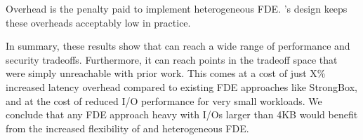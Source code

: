 Overhead is the penalty paid to implement heterogeneous FDE. \sys's design keeps
these overheads acceptably low in practice.

In summary, these results show that \sys can reach a wide range of performance
and security tradeoffs. Furthermore, it can reach points in the tradeoff space
that were simply unreachable with prior work. This comes at a cost of just X\%
increased latency overhead compared to existing FDE approaches like StrongBox,
and at the cost of reduced I/O performance for very small workloads. We conclude
that any FDE approach heavy with I/Os larger than 4KB would benefit from the
increased flexibility of \sys and heterogeneous FDE.
